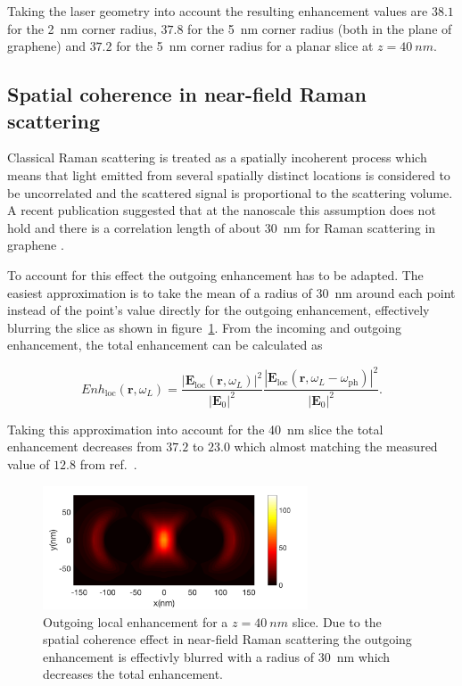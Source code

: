 Taking the laser geometry into account the resulting enhancement values are $38.1$ for the \SI{2}{nm} corner radius, $37.8$ for the \SI{5}{nm} corner radius (both in the plane of graphene) and $37.2$ for the \SI{5}{nm} corner radius for a planar slice at $z=\SI{40}{nm}$.

\subsection{Spatial coherence in near-field Raman scattering}

Classical Raman scattering is treated as a spatially incoherent process which means that light emitted from several spatially distinct locations is considered to be uncorrelated and the scattered signal is proportional to the scattering volume. A recent publication suggested that at the nanoscale this assumption does not hold and there is a correlation length of about \SI{30}{nm} for Raman scattering in graphene \cite{coherence}.

To account for this effect the outgoing enhancement has to be adapted. The easiest approximation is to take the mean of a radius of \SI{30}{nm} around each point instead of the point's value directly for the outgoing enhancement, effectively blurring the slice as shown in figure~\ref{fig:coherence}. From the incoming and outgoing enhancement, the total enhancement can be calculated as\cite{maier2007}

\begin{equation}
  Enh_\mathrm{loc}(\mathbf{r},\omega_L)=\frac{\left|\mathbf{E}_\mathrm{loc}(\mathbf{r}, \omega_L)\right|^2}{\left|\mathbf{E}_0\right|^2}\frac{\left|\mathbf{E}_\mathrm{loc}(\mathbf{r}, \omega_L-\omega_\mathrm{ph})\right|^2}{\left|\mathbf{E}_0\right|^2}.
\end{equation}

Taking this approximation into account for the \SI{40}{nm} slice the total enhancement decreases from $37.2$ to $23.0$ which almost matching the measured value of $12.8$ from ref.~\cite{heeg}.

\begin{figure}[!h]
  \centering
  \includegraphics[width=0.7\textwidth]{./images/coherence.png}
  \caption{Outgoing local enhancement for a $z=\SI{40}{nm}$ slice. Due to the spatial coherence effect in near-field Raman scattering the outgoing enhancement is effectivly blurred with a radius of \SI{30}{nm} which decreases the total enhancement.}
  \label{fig:coherence}
\end{figure}
